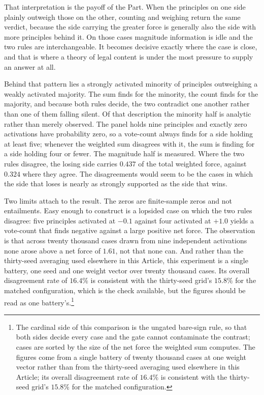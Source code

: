 That interpretation is the payoff of the Part. When the principles on one
side plainly outweigh those on the other, counting and weighing return the
same verdict, because the side carrying the greater force is generally also
the side with more principles behind it. On those cases magnitude
information is idle and the two rules are interchangeable. It becomes
decisive exactly where the case is close, and that is where a theory of legal content
is under the most pressure to supply an answer at all.

Behind that pattern lies a strongly activated minority of principles
outweighing a weakly activated majority. The sum finds for the minority,
the count finds for the majority, and because both rules decide, the two
contradict one another rather than one of them falling silent. Of that
description the minority half is analytic rather than merely observed. The panel holds
nine principles and exactly zero activations have probability zero, so a
vote-count always finds for a side holding at least five; whenever the
weighted sum disagrees with it, the sum is finding for a side holding
four or fewer. The magnitude half is measured. Where the two rules disagree, the losing
side carries $0.437$ of the total weighted force, against $0.324$ where
they agree. The disagreements would seem to be the cases in which the side
that loses is nearly as strongly supported as the side that wins.

Two limits attach to the result. The zeros are finite-sample zeros and not
entailments. Easy enough to construct is a lopsided case on which the two
rules disagree: five principles activated at $-0.1$ against four activated
at $+1.0$ yields a vote-count that finds negative against a large positive
net force. The observation is that across twenty thousand cases drawn from
nine independent activations none arose above a net force of $1.61$, not
that none can. And rather than the thirty-seed averaging used elsewhere in this Article,
this experiment is a single battery, one seed and one weight vector over
twenty thousand cases. Its overall disagreement rate
of $16.4\%$ is consistent with the thirty-seed grid's $15.8\%$ for the
matched configuration, which is the check available, but the figures
should be read as one battery's.\footnote{The cardinal side of this
comparison is the ungated bare-sign rule, so that both sides decide every
case and the gate cannot contaminate the contrast; cases are sorted by
the size of the net force the weighted sum computes. The figures come from
a single battery of twenty thousand cases at one weight vector rather than
from the thirty-seed averaging used elsewhere in this Article; its overall
disagreement rate of $16.4\%$ is consistent with the thirty-seed grid's
$15.8\%$ for the matched configuration.}

